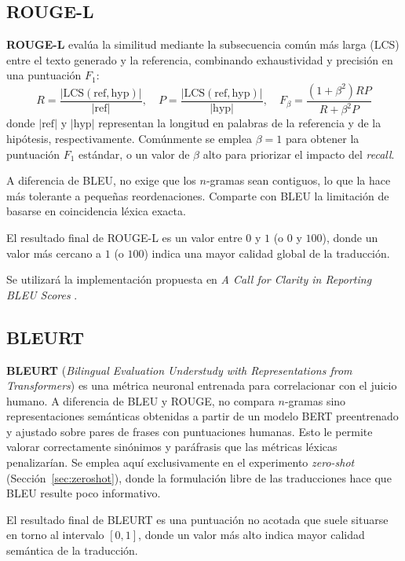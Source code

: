 \subsection{ROUGE-L}
\textbf{ROUGE-L} \cite{ROUGE} evalúa la similitud mediante la subsecuencia común más larga (LCS) entre el texto generado y la referencia, combinando exhaustividad y precisión en una puntuación $F_1$:
\begin{equation*}
  R = \frac{|\text{LCS}(\text{ref}, \text{hyp})|}{|\text{ref}|}, \quad
  P = \frac{|\text{LCS}(\text{ref}, \text{hyp})|}{|\text{hyp}|}, \quad
  F_\beta = \frac{(1 + \beta^2)RP}{R + \beta^2P}
\end{equation*}
donde $|\text{ref}|$ y $|\text{hyp}|$ representan la longitud en palabras de la referencia y de la hipótesis, respectivamente.
Comúnmente se emplea $\beta = 1$ para obtener la puntuación $F_1$ estándar, o un valor de $\beta$ alto para priorizar el impacto del \textit{recall}.

A diferencia de BLEU, no exige que los $n$-gramas sean contiguos, lo que la hace más tolerante a pequeñas reordenaciones.
Comparte con BLEU la limitación de basarse en coincidencia léxica exacta.

El resultado final de ROUGE-L es un valor entre $0$ y $1$ (o $0$ y $100$), donde un valor más cercano a $1$ (o $100$) indica una mayor calidad global de la traducción.

Se utilizará la implementación propuesta en \textit{A Call for Clarity in Reporting BLEU Scores} \cite{SBleu}.

\subsection{BLEURT}
\textbf{BLEURT} (\textit{Bilingual Evaluation Understudy with Representations from Transformers}) \cite{BLEURT} es una métrica neuronal entrenada para correlacionar con el juicio humano.
A diferencia de BLEU y ROUGE, no compara $n$-gramas sino representaciones semánticas obtenidas a partir de un modelo BERT preentrenado y ajustado sobre pares de frases con puntuaciones humanas.
Esto le permite valorar correctamente sinónimos y paráfrasis que las métricas léxicas penalizarían.
Se emplea aquí exclusivamente en el experimento \textit{zero-shot} (Sección~\ref{sec:zeroshot}), donde la formulación libre de las traducciones hace que BLEU resulte poco informativo.

El resultado final de BLEURT es una puntuación no acotada que suele situarse en torno al intervalo $[0,1]$, donde un valor más alto indica mayor calidad semántica de la traducción.

